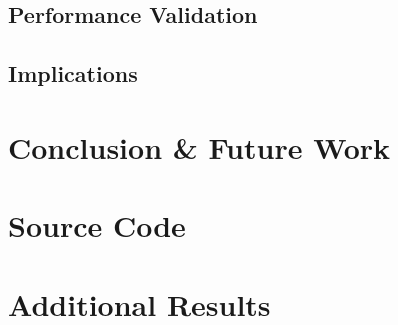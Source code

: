 \documentclass[10pt, a4paper]{report}
\renewcommand{\footnotesize}{\fontsize{8}{9}\selectfont}
\begin{document}
\section{Performance Validation}

\section{Implications}

\chapter{Conclusion \& Future Work}





\clearpage
{\footnotesize


}

\appendix

\chapter{Source Code}

\chapter{Additional Results}
\end{document}
